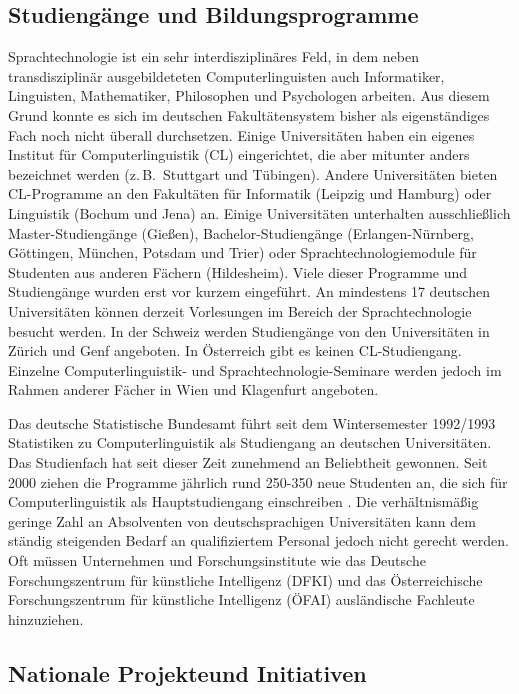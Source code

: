 \begin{multicols}{2}
\subsection{Studiengänge und Bildungsprogramme}

Sprachtechnologie ist ein sehr interdisziplinäres Feld, 
in dem neben transdisziplinär ausgebildeteten Computerlinguisten auch Informatiker, Linguisten, Mathematiker, Philosophen und Psychologen arbeiten.
Aus diesem Grund konnte es sich im deutschen Fakultätensystem 
bisher als eigenständiges Fach noch nicht überall durchsetzen.
Einige Universitäten haben ein eigenes Institut für Computerlinguistik (CL) 
eingerichtet, die aber mitunter anders bezeichnet werden (z.\,B.~Stuttgart und Tübingen).
Andere Universitäten bieten CL-Pro\-gram\-me an den Fakultäten für Informatik (Leipzig und Hamburg) oder Linguistik (Bochum und Jena) an. Einige Universitäten 
unterhalten ausschließlich 
Master-Stu\-dien\-gänge (Gießen), 
Bachelor-Studiengänge (Er\-langen-Nürn\-berg, Göttingen, München, Potsdam und Trier) oder Sprachtechnologiemodule für Studenten aus anderen Fächern (Hildesheim). Viele dieser Programme und Studiengänge wurden erst vor kurzem eingeführt. An mindestens 17 deutschen Universitäten können derzeit Vorlesungen im Bereich der Sprachtechnologie besucht werden. In der Schweiz werden Studiengänge von den Universitäten in Zürich und Genf angeboten. In Österreich gibt es keinen CL-Stu\-dien\-gang. Einzelne Com\-pu\-ter\-lingu\-istik- und Sprach\-tech\-no\-lo\-gie-Se\-mi\-nare werden jedoch im Rahmen anderer Fächer in Wien und Klagenfurt angeboten.

Das deutsche Statistische Bundesamt führt seit dem Wintersemester 1992/1993 Statistiken zu Computerlinguistik als Studiengang an deutschen Universitäten. Das Studienfach hat seit dieser Zeit zunehmend an Beliebtheit gewonnen. Seit 2000 ziehen die Programme jährlich rund 250-350 neue Studenten an, die sich für Computerlinguistik als Hauptstudiengang einschreiben \cite{wie1}. Die verhältnismäßig geringe Zahl an Absolventen von deutschsprachigen Universitäten kann dem ständig steigenden Bedarf an qualifiziertem Personal jedoch
nicht gerecht werden. Oft müssen Unternehmen und Forschungsinstitute wie das Deutsche Forschungszentrum für künstliche Intelligenz (DFKI) und das Österreichische Forschungszentrum für künstliche Intelligenz (ÖFAI) ausländische Fachleute hinzuziehen.

\subsection[Nationale Projekte und Initiativen]{Nationale Projekte\newline und Initiativen}


\end{multicols}
